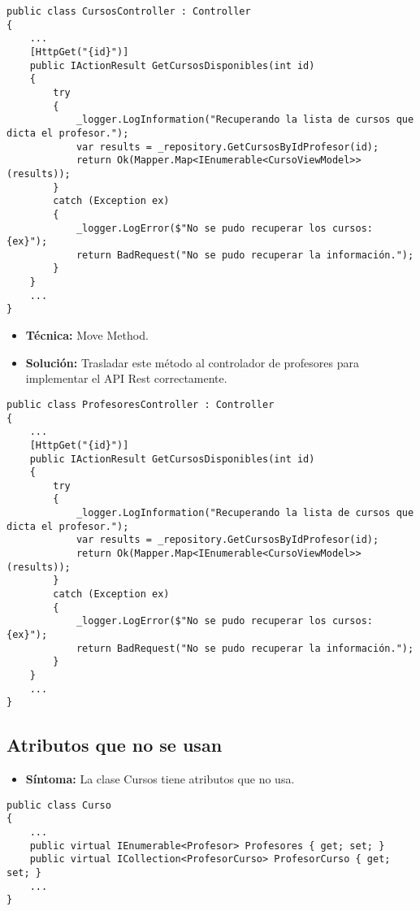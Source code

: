 \begin{lstlisting}[language={[Sharp]C}]
public class CursosController : Controller
{
	...	
	[HttpGet("{id}")]
	public IActionResult GetCursosDisponibles(int id)
	{
		try
		{
			_logger.LogInformation("Recuperando la lista de cursos que dicta el profesor.");
			var results = _repository.GetCursosByIdProfesor(id);
			return Ok(Mapper.Map<IEnumerable<CursoViewModel>>(results));
		}
		catch (Exception ex)
		{
			_logger.LogError($"No se pudo recuperar los cursos: {ex}");
			return BadRequest("No se pudo recuperar la información.");
		}
	}	
	...
}
\end{lstlisting}

\begin{itemize}
	\item \textbf{Técnica:} Move Method.
	\item \textbf{Solución:} Trasladar este método al controlador de profesores para implementar el API Rest correctamente. 
\end{itemize}

\begin{lstlisting}[language={[Sharp]C}]
public class ProfesoresController : Controller
{
	...
	[HttpGet("{id}")]
	public IActionResult GetCursosDisponibles(int id)
	{
		try
		{
			_logger.LogInformation("Recuperando la lista de cursos que dicta el profesor.");
			var results = _repository.GetCursosByIdProfesor(id);
			return Ok(Mapper.Map<IEnumerable<CursoViewModel>>(results));
		}
		catch (Exception ex)
		{
			_logger.LogError($"No se pudo recuperar los cursos: {ex}");
			return BadRequest("No se pudo recuperar la información.");
		}
	}	
	...
}
\end{lstlisting}





\subsection{Atributos que no se usan}
\begin{itemize}
	\item \textbf{Síntoma:} La clase Cursos tiene atributos que no usa.
\end{itemize}

\begin{lstlisting}[language={[Sharp]C}]
public class Curso
{      
	...
	public virtual IEnumerable<Profesor> Profesores { get; set; }	
	public virtual ICollection<ProfesorCurso> ProfesorCurso { get; set; }
	...
}

\end{lstlisting}

